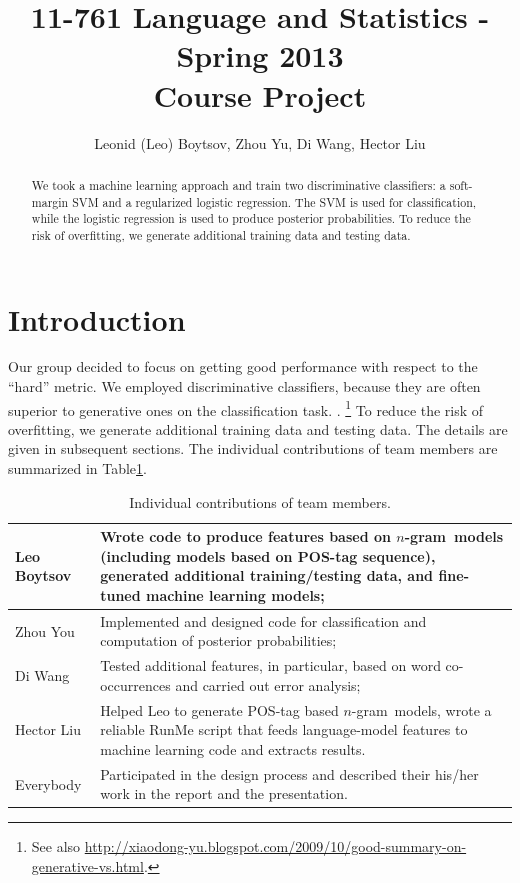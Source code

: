 \documentclass[11pt]{article}
\newcommand{\ngram}{\mbox{$n$-gram }}
\newcommand{\leocomment}[1]{\todo[color=red!40,caption={Leo's comment}]{#1}}
\begin{document}
\title{11-761 Language and Statistics - Spring 2013\\
Course Project}
\author{Leonid (Leo) Boytsov, Zhou Yu, Di Wang, Hector Liu}
\date{}
\maketitle

\begin{abstract}
We took a machine learning approach and train two discriminative classifiers: 
a soft-margin SVM and a regularized logistic regression.
The SVM is used for classification, while the logistic regression is used to produce posterior probabilities.
To reduce the risk of overfitting, we generate additional training data and testing data.
\end{abstract}


\section{Introduction}
Our group decided to focus on getting good performance with respect to the ``hard'' metric.
We employed discriminative classifiers, 
because they are often superior to generative ones on the classification task. \leocomment{I have simplified here.}\cite{roni2013,bishop2007generative}.
\footnote{See also \url{http://xiaodong-yu.blogspot.com/2009/10/good-summary-on-generative-vs.html}.}
To reduce the risk of overfitting, we generate additional training data and testing data.
The details are given in subsequent sections. The individual contributions of team members are summarized in Table\ref{TableContrib}.


\leocomment{Please, revise.}
\begin{table}[H]
\begin{tabular}{p{1in}|p{5in}}
\hline
Leo Boytsov &  Wrote code to produce features based on \ngram models (including models based on POS-tag sequence), generated additional training/testing data, and fine-tuned machine learning models;
\\\hline
Zhou You & Implemented and designed code for classification and computation of posterior probabilities;
\\\hline
Di Wang & Tested additional features, in particular, based on word co-occurrences and
carried out error analysis;
\\\hline
Hector Liu & Helped Leo to generate POS-tag based \ngram models, wrote a 
reliable RunMe script that feeds language-model features to machine learning code
and extracts results.
\\\hline
Everybody & Participated in the design process and described their his/her work
in the report and the presentation.
\\\hline
\end{tabular}

\caption{\label{TableContrib}Individual contributions of team members.}
\end{table}
\end{document}
